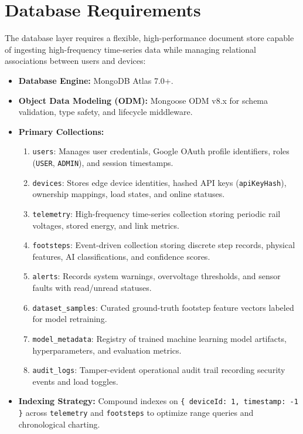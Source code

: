 \section{Database Requirements}
The database layer requires a flexible, high-performance document store capable of ingesting high-frequency time-series data while managing relational associations between users and devices:
\begin{itemize}
    \item \textbf{Database Engine:} MongoDB Atlas 7.0+.
    \item \textbf{Object Data Modeling (ODM):} Mongoose ODM v8.x for schema validation, type safety, and lifecycle middleware.
    \item \textbf{Primary Collections:}
    \begin{enumerate}
        \item \texttt{users}: Manages user credentials, Google OAuth profile identifiers, roles (\texttt{USER}, \texttt{ADMIN}), and session timestamps.
        \item \texttt{devices}: Stores edge device identities, hashed API keys (\texttt{apiKeyHash}), ownership mappings, load states, and online statuses.
        \item \texttt{telemetry}: High-frequency time-series collection storing periodic rail voltages, stored energy, and link metrics.
        \item \texttt{footsteps}: Event-driven collection storing discrete step records, physical features, AI classifications, and confidence scores.
        \item \texttt{alerts}: Records system warnings, overvoltage thresholds, and sensor faults with read/unread statuses.
        \item \texttt{dataset\_samples}: Curated ground-truth footstep feature vectors labeled for model retraining.
        \item \texttt{model\_metadata}: Registry of trained machine learning model artifacts, hyperparameters, and evaluation metrics.
        \item \texttt{audit\_logs}: Tamper-evident operational audit trail recording security events and load toggles.
    \end{enumerate}
    \item \textbf{Indexing Strategy:} Compound indexes on \texttt{\{ deviceId: 1, timestamp: -1 \}} across \texttt{telemetry} and \texttt{footsteps} to optimize range queries and chronological charting.
\end{itemize}

